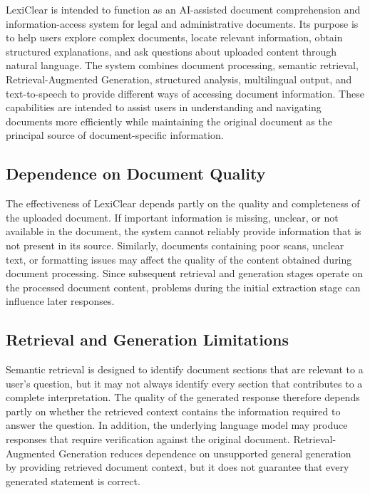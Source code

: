 \documentclass[12pt,a4paper,oneside]{report}
\begin{document}
LexiClear is intended to function as an AI-assisted document comprehension
and information-access system for legal and administrative documents. Its
purpose is to help users explore complex documents, locate relevant
information, obtain structured explanations, and ask questions about
uploaded content through natural language. The system combines document
processing, semantic retrieval, Retrieval-Augmented Generation, structured
analysis, multilingual output, and text-to-speech to provide different ways
of accessing document information. These capabilities are intended to assist
users in understanding and navigating documents more efficiently while
maintaining the original document as the principal source of
document-specific information.

\subsection{Dependence on Document Quality}

The effectiveness of LexiClear depends partly on the quality and completeness
of the uploaded document. If important information is missing, unclear, or
not available in the document, the system cannot reliably provide information
that is not present in its source. Similarly, documents containing poor
scans, unclear text, or formatting issues may affect the quality of the
content obtained during document processing. Since subsequent retrieval and
generation stages operate on the processed document content, problems during
the initial extraction stage can influence later responses.

\subsection{Retrieval and Generation Limitations}

Semantic retrieval is designed to identify document sections that are
relevant to a user's question, but it may not always identify every section
that contributes to a complete interpretation. The quality of the generated
response therefore depends partly on whether the retrieved context contains
the information required to answer the question. In addition, the underlying
language model may produce responses that require verification against the
original document. Retrieval-Augmented Generation reduces dependence on
unsupported general generation by providing retrieved document context, but
it does not guarantee that every generated statement is correct.
\end{document}

